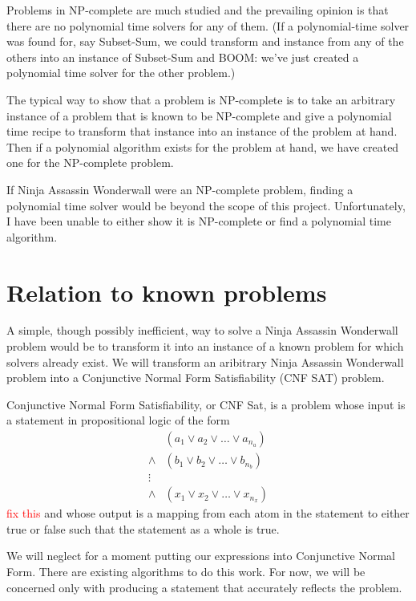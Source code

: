 \documentclass[12pt]{article}
\begin{document}
Problems in NP-complete are much studied and the prevailing opinion is that there are no polynomial time solvers for any of them. (If a polynomial-time solver was found for, say Subset-Sum, we could transform and instance from any of the others into an instance of Subset-Sum and BOOM: we've just created a polynomial time solver for the other problem.)

The typical way to show that a problem is NP-complete is to take an arbitrary instance of a problem that is known to be NP-complete and give a polynomial time recipe to transform that instance into an instance of the problem at hand. Then if a polynomial algorithm exists for the problem at hand, we have created one for the NP-complete problem. 

If Ninja Assassin Wonderwall were an NP-complete problem, finding a polynomial time solver would be beyond the scope of this project. Unfortunately, I have been unable to either show it is NP-complete or find a polynomial time algorithm. 

\section{Relation to known problems}
A simple, though possibly inefficient, way to solve a Ninja Assassin Wonderwall problem would be to transform it into an instance of a known problem for which solvers already exist. We will transform an aribitrary Ninja Assassin Wonderwall problem into a Conjunctive Normal Form Satisfiability (CNF SAT) problem.

Conjunctive Normal Form Satisfiability, or CNF Sat, is a problem whose input is a statement in propositional logic of the form
    \begin{align*} 
                & (a_1 \vee a_2 \vee \ldots \vee a_{n_a}) \\
        \wedge  & (b_1 \vee b_2 \vee \ldots \vee b_{n_b})\\
        \vdots  &\\
        \wedge  & (x_1 \vee x_2 \vee \ldots \vee x_{n_x})
    \end{align*} \textcolor{red}{fix this}
and whose output is a mapping from each atom in the statement to either true or false such that the statement as a whole is true. 

We will neglect for a moment putting our expressions into Conjunctive Normal Form. There are existing algorithms to do this work. For now, we will be concerned only with producing a statement that accurately reflects the problem.
\end{document}
